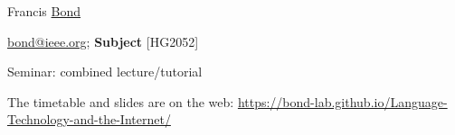 \documentclass[a4paper,landscape,headrule,footrule,xetex]{foils}
\begin{document}


\begin{description}
\item [Coordinator]  Francis \ul{Bond}
\item [Email] \url{bond@ieee.org}; \textbf{Subject} [HG2052]
\item[*] Seminar: combined lecture/tutorial
  \item The timetable and slides are on the web: \url{https://bond-lab.github.io/Language-Technology-and-the-Internet/}
\end{description}


\end{document}
